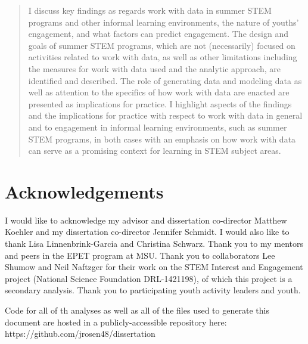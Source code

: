 \documentclass[]{msu-thesis}
\theoremstyle{definition}
\theoremstyle{definition}
\theoremstyle{definition}
\theoremstyle{remark}
\begin{document}
\begin{abstract}
I discuss key findings as regards work with data in summer STEM programs and other informal learning environments, the nature of youths' engagement, and what factors can predict engagement. The design and goals of summer STEM programs, which are not (necessarily) focused on activities related to work with data, as well as other limitations including the measures for work with data used and the analytic approach, are identified and described. The role of generating data and modeling data as well as attention to the specifics of how work with data are enacted are presented as implications for practice. I highlight aspects of the findings and the implications for practice with respect to work with data in general and to engagement in informal learning environments, such as summer STEM programs, in both cases with an emphasis on how work with data can serve as a promising context for learning in STEM subject areas.

\end{abstract}

\clearpage

\makecopyrightpage

%
\makededicationpage
%
\clearpage

\chapter*{Acknowledgements}
\DoubleSpacing %
I would like to acknowledge my advisor and dissertation co-director Matthew Koehler and my dissertation co-director Jennifer Schmidt. I would also like to thank Lisa Linnenbrink-Garcia and Christina Schwarz. Thank you to my mentors and peers in the EPET program at MSU. Thank you to collaborators Lee Shumow and Neil Naftzger for their work on the STEM Interest and Engagement project (National Science Foundation DRL-1421198), of which this project is a secondary analysis. Thank you to participating youth activity leaders and youth.

Code for all of th analyses as well as all of the files used to generate this document are hosted in a publicly-accessible repository here: https://github.com/jrosen48/dissertation
\end{document}
